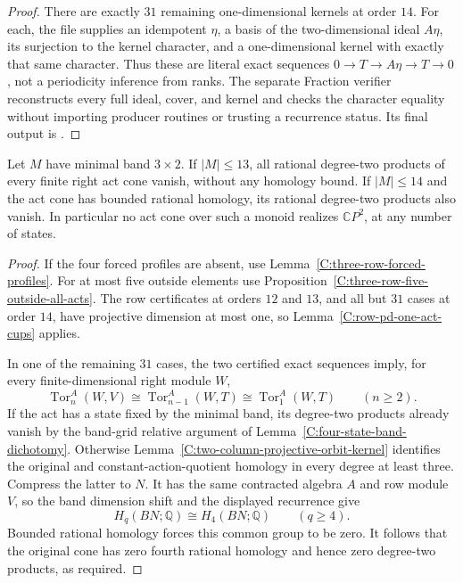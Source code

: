 \begin{proof}
There are exactly $31$ remaining one-dimensional kernels at
order $14$.  For each, the file
 supplies an idempotent
$\eta$, a basis of the two-dimensional ideal $A\eta$, its
surjection to the kernel character, and a one-dimensional
kernel with exactly that same character.  Thus these are
literal exact sequences $0\to T\to A\eta\to T\to0$,
not a periodicity inference from ranks.  The separate Fraction
verifier 
reconstructs every full ideal, cover, and kernel and checks the
character equality without importing producer routines or
trusting a recurrence status.  Its final output is
.
\end{proof}

\begin{theorem}
\label{C:three-row-fourteen-act-cones}
Let $M$ have minimal band $3\times2$.
If $|M|\leq13$, all rational degree-two products of every
finite right act cone vanish, without any homology bound.
If $|M|\leq14$ and the act cone has bounded rational homology,
its rational degree-two products also vanish.
In particular no act cone over such a monoid realizes
$\mathbb CP^2$, at any number of states.
\end{theorem}
\begin{proof}
If the four forced profiles are absent, use
Lemma~\ref{C:three-row-forced-profiles}.
For at most five outside elements use
Proposition~\ref{C:three-row-five-outside-all-acts}.
The row certificates at orders $12$ and $13$, and all but
$31$ cases at order $14$, have projective dimension at most
one, so Lemma~\ref{C:row-pd-one-act-cups} applies.

In one of the remaining $31$ cases, the two certified exact
sequences imply, for every finite-dimensional right module $W$,
\[
 \operatorname{Tor}^{A}_n(W,V)
 \cong\operatorname{Tor}^{A}_{n-1}(W,T)
 \cong\operatorname{Tor}^{A}_1(W,T)
 \qquad(n\geq2).
\]
If the act has a state fixed by the minimal band, its
degree-two products already vanish by the band-grid relative
argument of Lemma~\ref{C:four-state-band-dichotomy}.
Otherwise Lemma~\ref{C:two-column-projective-orbit-kernel}
identifies the original and constant-action-quotient homology
in every degree at least three.  Compress the latter to $N$.
It has the same contracted algebra $A$ and row module $V$,
so the band dimension shift and the displayed recurrence give
\[
 H_q(BN;\mathbb Q)\cong H_4(BN;\mathbb Q)
 \qquad(q\geq4).
\]
Bounded rational homology forces this common group to be zero.
It follows that the original cone has zero fourth rational
homology and hence zero degree-two products, as required.
\end{proof}

